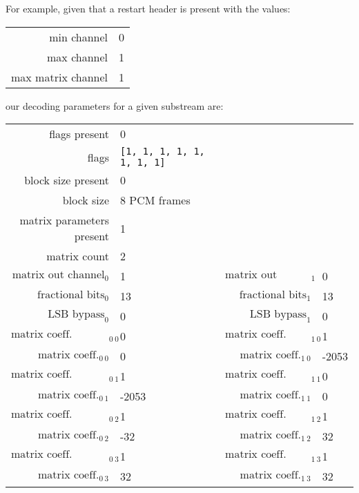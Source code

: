 \clearpage

For example, given that a restart header is present with the values:
\begin{table}[h]
  {
    \begin{tabular}{rl}
      min channel & 0 \\
      max channel & 1 \\
      max matrix channel & 1 \\
    \end{tabular}
  }
\end{table}
\par
\noindent
our decoding parameters for a given substream are:
\begin{table}[h]
{
  \begin{tabular}{rlrl}
    \hline
    flags present & 0 \\
    flags & \texttt{[1, 1, 1, 1, 1, 1, 1, 1]} \\
    \hline
    block size present & 0 \\
    block size & 8 PCM frames \\
    \hline
    matrix parameters present & 1 \\
    matrix count & 2 \\
    $\text{matrix out channel}_0$ & 1 &
    $\text{matrix out channel}_1$ & 0 \\
    $\text{fractional bits}_0$ & 13 &
    $\text{fractional bits}_1$ & 13 \\
    $\text{LSB bypass}_0$ & 0 &
    $\text{LSB bypass}_1$ & 0 \\
    $\text{matrix coeff. present}_{0~0}$ & 0 &
    $\text{matrix coeff. present}_{1~0}$ & 1 \\
    $\text{matrix coeff.}_{0~0}$ & 0 &
    $\text{matrix coeff.}_{1~0}$ & -2053 \\
    $\text{matrix coeff. present}_{0~1}$ & 1 &
    $\text{matrix coeff. present}_{1~1}$ & 0 \\
    $\text{matrix coeff.}_{0~1}$ & -2053 &
    $\text{matrix coeff.}_{1~1}$ & 0 \\
    $\text{matrix coeff. present}_{0~2}$ & 1 &
    $\text{matrix coeff. present}_{1~2}$ & 1 \\
    $\text{matrix coeff.}_{0~2}$ & -32 &
    $\text{matrix coeff.}_{1~2}$ & 32 \\
    $\text{matrix coeff. present}_{0~3}$ & 1 &
    $\text{matrix coeff. present}_{1~3}$ & 1 \\
    $\text{matrix coeff.}_{0~3}$ & 32 &
    $\text{matrix coeff.}_{1~3}$ & 32 \\

\end{tabular}}
\end{table}
